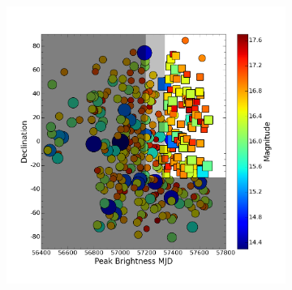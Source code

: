 




\begin{figure}
	\centering
	\begin{subfigure}{.5\textwidth}
	  \centering
	  \includegraphics[width=1\linewidth]{figures/invert_mag.png}
		\caption{\it \small{ }}
		\label{fig:var1}
	\end{subfigure}%
	\begin{subfigure}{.5\textwidth}
	  \centering

\end{subfigure}
\end{figure}
